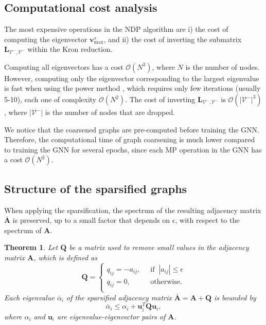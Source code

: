\documentclass[journal]{IEEEtran}
\def\v{{\mathbf v}}
\def\u{{\mathbf u}}
\def\A{{\mathbf A}}
\def\L{{\mathbf L}}
\newtheorem{theorem}{Theorem}
\begin{document}
\subsection{Computational cost analysis}
The most expensive operations in the NDP algorithm are i) the cost of computing the eigenvector $\v^s_\text{max}$, and ii) the cost of inverting the submatrix $\L_{\mathcal{V}^-, \mathcal{V}^-}$ within the Kron reduction.

Computing all eigenvectors has a cost $\mathcal{O}(N^3)$, where $N$ is the number of nodes. However, computing only the eigenvector corresponding to the largest eigenvalue is fast when using the power method \cite{watkins2004fundamentals}, which requires only few iterations (usually 5-10), each one of complexity $\mathcal{O}(N^2)$.
The cost of inverting $\L_{\mathcal{V}^-, \mathcal{V}^-}$ is $\mathcal{O}(|\mathcal{V}^-|^3)$, where $|\mathcal{V}^-|$ is the number of nodes that are dropped. 


We notice that the coarsened graphs are pre-computed before training the GNN.
Therefore, the computational time of graph coarsening is much lower compared to training the GNN for several epochs, since each MP operation in the GNN has a cost $\mathcal{O}(N^2)$.


\subsection{Structure of the sparsified graphs}
When applying the sparsification, the spectrum of the resulting adjacency matrix $\bar{\A}$ is preserved, up to a small factor that depends on $\epsilon$, with respect to the spectrum of $\A$.

\begin{theorem}
Let $\mathbf{Q}$ be a matrix used to remove small values in the adjacency matrix $\A$, which is defined as
\begin{equation}
    \mathbf{Q} = 
    \begin{cases}
    q_{ij} = - a_{ij}, & \;\; \text{if} \;\; |a_{ij}| \leq \epsilon \\
    q_{ij} = 0, &\;\; \text{otherwise}.\\
    \end{cases}
\end{equation}
Each eigenvalue $\bar \alpha_i$ of the sparsified adjacency matrix $\mathbf{\bar \A} = \A + \mathbf{Q}$ is bounded by 
\begin{equation}
    \bar \alpha_i \leq \alpha_i + \u_i^T \mathbf{Q} \u_i, 
\end{equation}
where $\alpha_i$ and $\u_i$ are eigenvalue-eigenvector pairs of $\A$.
\end{theorem}
\end{document}
